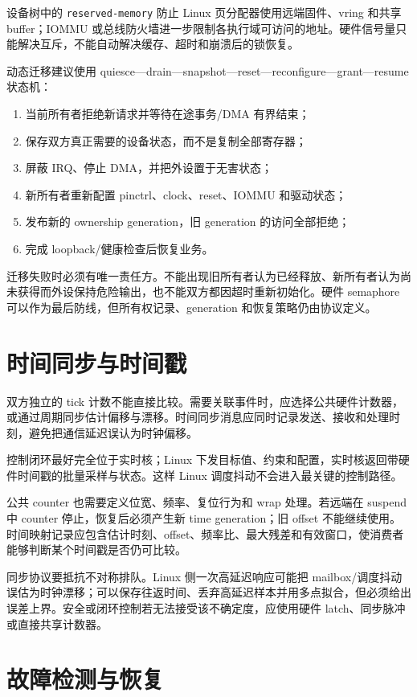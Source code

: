 设备树中的 \texttt{reserved-memory} 防止 Linux 页分配器使用远端固件、vring 和共享 buffer；IOMMU 或总线防火墙进一步限制各执行域可访问的地址。硬件信号量只能解决互斥，不能自动解决缓存、超时和崩溃后的锁恢复。

动态迁移建议使用 quiesce---drain---snapshot---reset---reconfigure---grant---resume 状态机：
\begin{enumerate}
  \item 当前所有者拒绝新请求并等待在途事务/DMA 有界结束；
  \item 保存双方真正需要的设备状态，而不是复制全部寄存器；
  \item 屏蔽 IRQ、停止 DMA，并把外设置于无害状态；
  \item 新所有者重新配置 pinctrl、clock、reset、IOMMU 和驱动状态；
  \item 发布新的 ownership generation，旧 generation 的访问全部拒绝；
  \item 完成 loopback/健康检查后恢复业务。
\end{enumerate}

迁移失败时必须有唯一责任方。不能出现旧所有者认为已经释放、新所有者认为尚未获得而外设保持危险输出，也不能双方都因超时重新初始化。硬件 semaphore 可以作为最后防线，但所有权记录、generation 和恢复策略仍由协议定义。

\section{时间同步与时间戳}

双方独立的 tick 计数不能直接比较。需要关联事件时，应选择公共硬件计数器，或通过周期同步估计偏移与漂移。时间同步消息应同时记录发送、接收和处理时刻，避免把通信延迟误认为时钟偏移。

控制闭环最好完全位于实时核；Linux 下发目标值、约束和配置，实时核返回带硬件时间戳的批量采样与状态。这样 Linux 调度抖动不会进入最关键的控制路径。

公共 counter 也需要定义位宽、频率、复位行为和 wrap 处理。若远端在 suspend 中 counter 停止，恢复后必须产生新 time generation；旧 offset 不能继续使用。时间映射记录应包含估计时刻、offset、频率比、最大残差和有效窗口，使消费者能够判断某个时间戳是否仍可比较。

同步协议要抵抗不对称排队。Linux 侧一次高延迟响应可能把 mailbox/调度抖动误估为时钟漂移；可以保存往返时间、丢弃高延迟样本并用多点拟合，但必须给出误差上界。安全或闭环控制若无法接受该不确定度，应使用硬件 latch、同步脉冲或直接共享计数器。

\section{故障检测与恢复}

